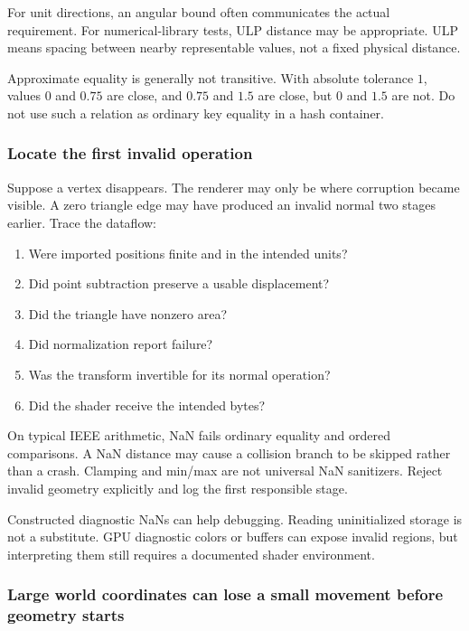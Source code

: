For unit directions, an angular bound often communicates the actual requirement. For numerical-library tests, ULP distance may be appropriate. ULP means spacing between nearby representable values, not a fixed physical distance.

Approximate equality is generally not transitive. With absolute tolerance \(1\), values \(0\) and \(0.75\) are close, and \(0.75\) and \(1.5\) are close, but \(0\) and \(1.5\) are not. Do not use such a relation as ordinary key equality in a hash container.

\subsubsection{Locate the first invalid operation}\label{02-foundations-ii-ch037-locate-the-first-invalid-operation}

\hypertarget{02-foundations-ii-ch037-locate-the-first-invalid-operation}{}

Suppose a vertex disappears. The renderer may only be where corruption became visible. A zero triangle edge may have produced an invalid normal two stages earlier. Trace the dataflow:

\begin{enumerate}
\def\labelenumi{\arabic{enumi}.}
\tightlist
\item
  Were imported positions finite and in the intended units?
\item
  Did point subtraction preserve a usable displacement?
\item
  Did the triangle have nonzero area?
\item
  Did normalization report failure?
\item
  Was the transform invertible for its normal operation?
\item
  Did the shader receive the intended bytes?
\end{enumerate}

On typical IEEE arithmetic, NaN fails ordinary equality and ordered comparisons. A NaN distance may cause a collision branch to be skipped rather than a crash. Clamping and min/max are not universal NaN sanitizers. Reject invalid geometry explicitly and log the first responsible stage.

Constructed diagnostic NaNs can help debugging. Reading uninitialized storage is not a substitute. GPU diagnostic colors or buffers can expose invalid regions, but interpreting them still requires a documented shader environment.

\subsubsection{Large world coordinates can lose a small movement before geometry starts}\label{02-foundations-ii-ch037-large-world-coordinates-can-lose-a-small-movement-before-geometry-starts}

